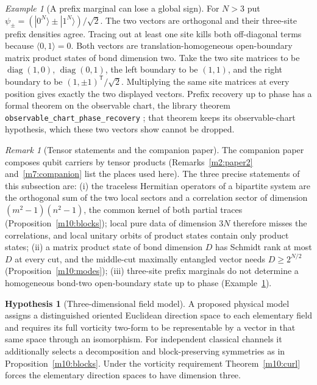 \documentclass[11pt,reqno]{amsart}
\theoremstyle{definition}
\newtheorem{hypothesis}[theorem]{Hypothesis}
\theoremstyle{remark}
\newtheorem{remark}[theorem]{Remark}
\newtheorem{example}[theorem]{Example}
\numberwithin{equation}{section}
\begin{document}
\begin{example}[A prefix marginal can lose a global sign]\label{m10:prefix}
For \(N>3\) put \(\psi_\pm=(|0^N\rangle\pm |1^N\rangle)/\sqrt2\).
The two vectors are orthogonal and their three-site prefix
densities agree. Tracing out at least one site kills both
off-diagonal terms because \(\langle0,1\rangle=0\). Both vectors
are translation-homogeneous open-boundary matrix product states
of bond dimension two. Take the two site matrices to be
\(\operatorname{diag}(1,0)\), \(\operatorname{diag}(0,1)\),
the left boundary to be \((1,1)\), and the right boundary
to be \((1,\pm1)^{\mathsf T}/\sqrt2\). Multiplying the same
site matrices at every position gives exactly the two displayed
vectors. Prefix recovery up to phase has a formal theorem on
the observable chart, the library theorem
\texttt{observable\_chart\_phase\_recovery} \cite{Tru};
that theorem keeps its observable-chart hypothesis, which these two
vectors show cannot be dropped.
\end{example}

\begin{remark}[Tensor statements and the companion paper]\label{m10:tensor-companion}
The companion paper composes qubit carriers by tensor products
(Remarks~\ref{m2:paper2} and~\ref{m7:companion} list the places used
here). The three precise statements of this subsection are:
(i) the traceless Hermitian operators of a bipartite system are the
orthogonal sum of the two local sectors and a correlation sector of
dimension \((m^2-1)(n^2-1)\), the common kernel of both partial traces
(Proposition~\ref{m10:blocks}); local pure data of dimension \(3N\)
therefore misses the correlations, and local unitary orbits of product
states contain only product states;
(ii) a matrix product state of bond dimension \(D\) has Schmidt rank at
most \(D\) at every cut, and the middle-cut maximally entangled vector
needs \(D\ge2^{N/2}\) (Proposition~\ref{m10:modes});
(iii) three-site prefix marginals do not determine a homogeneous
bond-two open-boundary state up to phase (Example~\ref{m10:prefix}).
\end{remark}

\begin{hypothesis}[Three-dimensional field model]\label{m10:field-model}
A proposed physical model assigns a distinguished oriented
Euclidean direction space to each elementary field and requires
its full vorticity two-form to be representable by a vector in
that same space through an isomorphism. For independent classical
channels it additionally selects a decomposition and
block-preserving symmetries as in Proposition~\ref{m10:blocks}.
Under the vorticity requirement Theorem~\ref{m10:curl} forces
the elementary direction spaces to have dimension three.
\end{hypothesis}
\end{document}
